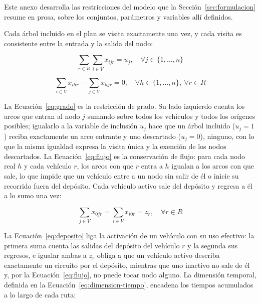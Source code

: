 \label{anx:formulacion}

Este anexo desarrolla las restricciones del modelo que la Sección~\ref{sec:formulacion} resume en
prosa, sobre los conjuntos, parámetros y variables allí definidos.

Cada árbol incluido en el plan se visita exactamente una vez, y cada visita es consistente entre la
entrada y la salida del nodo:

\begin{equation}
  \sum_{r \in R} \sum_{i \in V} x_{ijr} = u_j, \quad \forall j \in \{1,\ldots,n\}
  \label{eq:grado}
\end{equation}

\begin{equation}
  \sum_{i \in V} x_{ihr} - \sum_{j \in V} x_{hjr} = 0,
  \quad \forall h \in \{1,\ldots,n\},\ \forall r \in R
  \label{eq:flujo}
\end{equation}

La Ecuación~\ref{eq:grado} es la restricción de grado. Su lado izquierdo cuenta los arcos que
entran al nodo $j$ sumando sobre todos los vehículos y todos los orígenes posibles; igualarlo a la
variable de inclusión $u_j$ hace que un árbol incluido ($u_j = 1$) reciba exactamente un arco
entrante y uno descartado ($u_j = 0$), ninguno, con lo que la misma igualdad expresa la visita
única y la exención de los nodos descartados. La Ecuación~\ref{eq:flujo} es la conservación de
flujo: para cada nodo real $h$ y cada vehículo $r$, los arcos con que $r$ entra a $h$ igualan a los
arcos con que sale, lo que impide que un vehículo entre a un nodo sin salir de él o inicie su
recorrido fuera del depósito. Cada vehículo activo sale del depósito y regresa a él a lo sumo una
vez:

\begin{equation}
  \sum_{j \in V} x_{0jr} = \sum_{i \in V} x_{i0r} = z_r, \quad \forall r \in R
  \label{eq:deposito}
\end{equation}

La Ecuación~\ref{eq:deposito} liga la activación de un vehículo con su uso efectivo: la primera
suma cuenta las salidas del depósito del vehículo $r$ y la segunda sus regresos, e igualar ambas a
$z_r$ obliga a que un vehículo activo describa exactamente un circuito por el depósito, mientras
que uno inactivo no sale de él y, por la Ecuación~\ref{eq:flujo}, no puede tocar nodo alguno. La
dimensión temporal, definida en la Ecuación~\ref{eq:dimension-tiempo}, encadena los tiempos
acumulados a lo largo de cada ruta:


